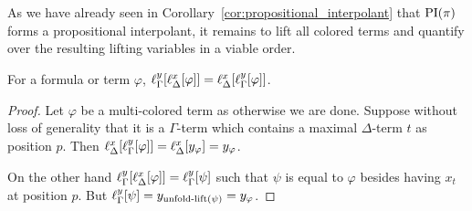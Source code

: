 As we have already seen in Corollary~\ref{cor:propositional_interpolant} that $\operatorname{PI}(\pi)$ forms a propositional interpolant, it remains to lift all colored terms and quantify over the resulting lifting variables in a viable order.


\begin{lemma}

	For a formula or term $\varphi$,
	$ \ell_{\Gamma}^{y}[ \ell_{\Delta}^{x}[ \varphi]  ] =
	\ell_{\Delta}^{x}[ \ell_{\Gamma}^{y}[ \varphi ]  ]$.
	\label{lemma:lifting_order_not_relevant}
\end{lemma}
\begin{proof}
	Let $\varphi$ be a multi-colored term as otherwise we are done.
	Suppose without loss of generality that it is a $\Gamma$-term which contains a maximal $\Delta$-term $t$ as position $p$.
	Then $\ell_{\Delta}^{x}[ \ell_{\Gamma}^{y}[ \varphi ]  ]
	= \ell_{\Delta}^{x}[ y_\varphi ]
	= y_\varphi $.

	On the other hand
	$\ell_{\Gamma}^{y}[ \ell_{\Delta}^{x}[ \varphi]  ] = \ell_{\Gamma}^{y}[ \psi ]$ such that $\psi$ is equal to $\varphi$ besides having $x_t$ at position $p$.
	But $\ell_{\Gamma}^{y}[ \psi ] = y_{\operatorname{unfold-lift}(\psi)} = y_\varphi$.
\end{proof}


